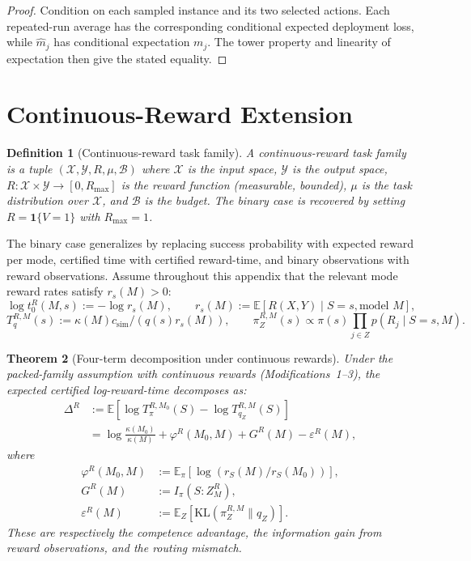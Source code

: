 \documentclass[10pt]{article}
\theoremstyle{paperplain}
\newtheorem{theorem}{Theorem}[section]
\theoremstyle{paperdefinition}
\newtheorem{definition}[theorem]{Definition}
\theoremstyle{paperremark}
\newcommand{\KL}{\mathrm{KL}}
\newcommand{\E}{\mathbb{E}}
\newcommand{\cX}{\mathcal{X}}
\newcommand{\cY}{\mathcal{Y}}
\newcommand{\cB}{\mathcal{B}}
\begin{document}
\begin{proof}
Condition on each sampled instance and its two selected actions.
Each repeated-run average has the corresponding conditional expected deployment loss, while $\widehat m_j$ has conditional expectation $m_j$.
The tower property and linearity of expectation then give the stated equality.
\end{proof}


\section{Continuous-Reward Extension}
\label{app:continuous-reward}

\begin{definition}[Continuous-reward task family]
\label{def:continuous-reward-task}
A \emph{continuous-reward task family} is a tuple $(\cX, \cY, R, \mu, \cB)$ where
$\cX$ is the input space, $\cY$ is the output space,
$R : \cX \times \cY \to [0, R_{\max}]$ is the reward function (measurable, bounded),
$\mu$ is the task distribution over $\cX$, and $\cB$ is the budget.
The binary case is recovered by setting $R = \mathbf{1}\{V = 1\}$ with $R_{\max} = 1$.
\end{definition}

The binary case generalizes by replacing success probability with expected reward per mode, certified time with certified reward-time, and binary observations with reward observations. Assume throughout this appendix that the relevant mode reward rates satisfy $r_s(M)>0$:
\[
\log t_0^R(M,s):=-\log r_s(M),\qquad
r_s(M):=\E[R(X,Y)\mid S=s,\text{model }M],
\]
\[
T_q^{R,M}(s):=\kappa(M)c_{\mathrm{sim}}/(q(s)r_s(M)),
\qquad
\pi_Z^{R,M}(s)\propto \pi(s)\prod_{j\in Z}p(R_j\mid S=s,M).
\]

\begin{theorem}[Four-term decomposition under continuous rewards]
\label{thm:four-term-continuous}
Under the packed-family assumption with continuous rewards (Modifications~1--3), the expected certified log-reward-time decomposes as:
\[
\begin{aligned}
\Delta^R
&:= \E\!\left[\log T_\pi^{R,M_0}(S)
          - \log T_{q_Z}^{R,M}(S)\right] \\
&= \log \frac{\kappa(M_0)}{\kappa(M)}
   + \varphi^R(M_0, M) + G^R(M) - \varepsilon^R(M),
\end{aligned}
\]
where
\[
\begin{aligned}
\varphi^R(M_0, M) &:= \E_\pi[\log(r_S(M)/r_S(M_0))],\\
G^R(M) &:= I_\pi(S : Z^R_M),\\
\varepsilon^R(M) &:= \E_Z[\KL(\pi_Z^{R,M} \| q_Z)].
\end{aligned}
\]
These are respectively the competence advantage, the information gain from reward observations, and the routing mismatch.
\end{theorem}
\end{document}
